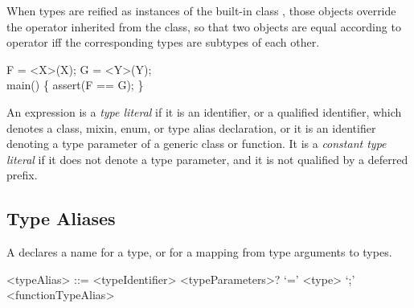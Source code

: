 \documentclass[makeidx]{article}
\begin{document}
{\LMHash{}%
When types are reified as instances of the built-in class ,
those objects override the \lit{==} operator
inherited from the  class, so that
two  objects are equal according to operator \lit{==}
if{}f the corresponding types are subtypes of each other.


\begin{dartCode}
\TYPEDEF{} F = \VOID{} \FUNCTION{}<X>(X);
\TYPEDEF{} G = \VOID{} \FUNCTION{}<Y>(Y);
\\
\VOID{} main() \{
  assert(F == G);
\}
\end{dartCode}

\LMHash{}%

\LMHash{}%
An expression is a \emph{type literal} if it is an identifier,
or a qualified identifier,
which denotes a class, mixin, enum, or type alias declaration, or it is
an identifier denoting a type parameter of a generic class or function.
It is a \emph{constant type literal} if it does not denote a type parameter,
and it is not qualified by a deferred prefix.


\subsection{Type Aliases}

\LMHash{}%
A  declares a name for a type,
or for a mapping from type arguments to types.


\begin{grammar}
<typeAlias> ::= \gnewline{}
  \TYPEDEF{} <typeIdentifier> <typeParameters>? `=' <type> `;'
  \alt \TYPEDEF{} <functionTypeAlias>


\end{grammar}}
\end{document}
